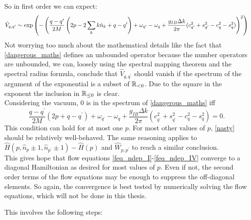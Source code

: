 So in first order we can expect:
\begin{align}\label{nasty}
\hat V_{q,q^\prime}\sim \mathrm{exp}\left(-\left(\frac{q-q^\prime}{2M}\left(2p-2\sum\limits_k k \hat n_k+q-q^\prime\right)+\omega_{q^\prime}-\omega_q + \frac{g_{IB}\Delta k}{2\pi}(c_{q^\prime}^2+s_{q^\prime}^2-c_{q}^2-s_{q}^2)\right)^2\right)
\end{align}
Not worrying too much about the mathematical details like the fact that \ref{dangerous_maths} defines an unbounded operator because the number operators are unbounded, we can, loosely using the spectral mapping theorem \cite{Arendt1984} and the spectral radius formula, conclude that $\hat V_{q,q^\prime}$ should vanish if the spectrum of the argument of the exponential is a subset of $\mathbb{R}_{<0}$. Due to the square in the exponent the inclusion in $\mathbb{R}_{\leq 0}$ is clear.  \\
Considering the vacuum, 0 is in the spectrum of \ref{dangerous_maths} iff 
\begin{equation}
\frac{q-q^\prime}{2M}\left(2p+q-q^\prime\right)+\omega_{q^\prime}-\omega_q + \frac{g_{IB}\Delta k}{2\pi}(c_{q^\prime}^2+s_{q^\prime}^2-c_{q}^2-s_{q}^2)=0.
\end{equation}
This condition can hold for at most one $p$. For most other values of $p$, \ref{nasty} should be relatively well-behaved.
The same reasoning applies to $\hat H(p,\hat n_p\pm1,\hat n_{p^\prime}\pm 1)-\hat H(p)$ and $\hat W_{p,p^\prime}$ to reach a similar conclusion.\\
This gives hope that flow equations \ref{feq_ndep_I}-\ref{feq_ndep_IV} converge to a diagonal Hamiltonian as desired for most values of $p$. Even if not, the second order terms of the flow equations may be enough to suppress the off-diagonal elements. So again, the convergence is best tested by numerically solving the flow equations, which will not be done in this thesis. \par
This involves the following steps: 
